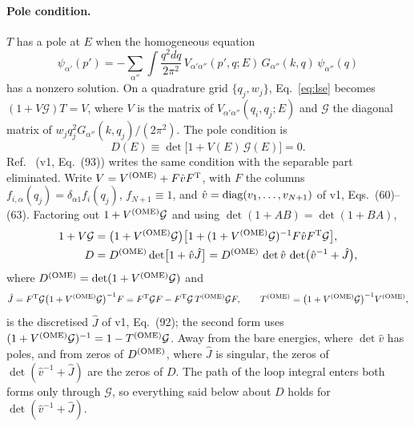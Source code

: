 \documentclass[11pt]{article}
\begin{document}
\paragraph{Pole condition.}
$T$ has a pole at $E$ when the homogeneous equation
\begin{equation}\label{eq:hom}
\psi_{\alpha'}(p')=-\sum_{\alpha''}\int\frac{q^2dq}{2\pi^2}\,V_{\alpha'\alpha''}(p',q;E)\,G_{\alpha''}(k,q)\,\psi_{\alpha''}(q)
\end{equation}
has a nonzero solution. On a quadrature grid $\{q_j,w_j\}$, Eq.~\eqref{eq:lse} becomes $(1+V\mathcal G)T=V$, where $V$ is the matrix of $V_{\alpha'\alpha''}(q_i,q_j;E)$ and $\mathcal G$ the diagonal matrix of $w_jq_j^2G_{\alpha''}(k,q_j)/(2\pi^2)$. The pole condition is
\begin{equation}\label{eq:D}
D(E)\equiv\det\bigl[1+V(E)\,\mathcal G(E)\bigr]=0 .
\end{equation}
Ref.~\cite{Zhang:2026iyr} (v1, Eq.~(93)) writes the same condition with the separable part eliminated. Write $V=V^{\rm(OME)}+F\hat vF^{\rm T}$, with $F$ the columns $f_{i,\alpha}(q_j)=\delta_{\alpha1}f_i(q_j)$, $f_{N+1}\equiv1$, and $\hat v={\rm diag}(v_1,\dots,v_{N+1})$ of v1, Eqs.~(60)--(63). Factoring out $1+V^{\rm(OME)}\mathcal G$ and using $\det(1+AB)=\det(1+BA)$,
\begin{align}
1+V\mathcal G&=\bigl(1+V^{\rm(OME)}\mathcal G\bigr)\bigl[1+(1+V^{\rm(OME)}\mathcal G)^{-1}F\hat vF^{\rm T}\mathcal G\bigr],\nonumber\\
D&=D^{\rm(OME)}\det\bigl[1+\hat v\hat J\bigr]=D^{\rm(OME)}\,\det\hat v\,\det\bigl(\hat v^{-1}+\hat J\bigr),\label{eq:Dfactor}
\end{align}
where $D^{\rm(OME)}=\det(1+V^{\rm(OME)}\mathcal G)$ and
\begin{equation}\label{eq:J}
\hat J=F^{\rm T}\mathcal G\bigl(1+V^{\rm(OME)}\mathcal G\bigr)^{-1}F=F^{\rm T}\mathcal GF-F^{\rm T}\mathcal G\,T^{\rm(OME)}\mathcal GF,\qquad T^{\rm(OME)}=\bigl(1+V^{\rm(OME)}\mathcal G\bigr)^{-1}V^{\rm(OME)},
\end{equation}
is the discretised $\hat J$ of v1, Eq.~(92); the second form uses $(1+V^{\rm(OME)}\mathcal G)^{-1}=1-T^{\rm(OME)}\mathcal G$. Away from the bare energies, where $\det\hat v$ has poles, and from zeros of $D^{\rm(OME)}$, where $\hat J$ is singular, the zeros of $\det(\hat v^{-1}+\hat J)$ are the zeros of $D$. The path of the loop integral enters both forms only through $\mathcal G$, so everything said below about $D$ holds for $\det(\hat v^{-1}+\hat J)$.
\end{document}
